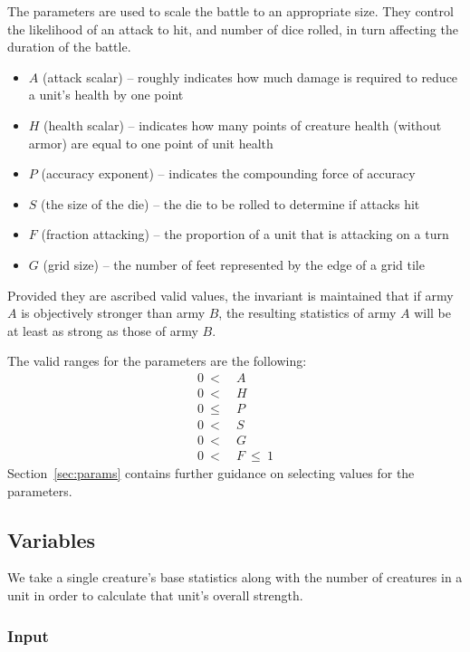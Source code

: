 \documentclass[twocolumn]{article}
\begin{document}
The parameters are used to scale the battle to an appropriate size.
They control the likelihood of an attack to hit,
and number of dice rolled,
in turn affecting the duration of the battle.

\begin{itemize}
    \item $A$ (attack scalar) -- roughly indicates how much damage is required to reduce a unit's health by one point
    \item $H$ (health scalar) -- indicates how many points of creature health (without armor) are equal to one point of unit health
    \item $P$ (accuracy exponent) -- indicates the compounding force of accuracy
    \item $S$ (the size of the die) -- the die to be rolled to determine if attacks hit
    \item $F$ (fraction attacking) -- the proportion of a unit that is attacking on a turn
    \item $G$ (grid size) -- the number of feet represented by the edge of a grid tile
\end{itemize}

Provided they are ascribed valid values,
the invariant is maintained that if army $A$ is objectively stronger than army $B$,
the resulting statistics of army $A$ will be at least as strong as those of army $B$.

The valid ranges for the parameters are the following:
\begin{align*}
    0~<~&A \\
    0~<~&H \\
    0~\leq~&P \\
    0~<~&S \\
    0~<~&G \\
    0~<~&F~\leq~1
\end{align*}
Section~\ref{sec:params} contains further guidance on selecting values for the parameters.

\subsection{Variables}

We take a single creature's base statistics along with the number of creatures in a unit
in order to calculate that unit's overall strength.

\subsubsection{Input}
\end{document}

